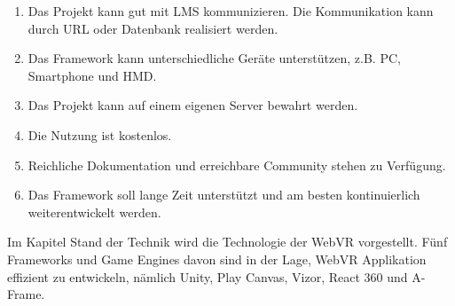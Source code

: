  \begin{enumerate}
     \item Das Projekt kann gut mit LMS kommunizieren. Die Kommunikation kann durch URL oder Datenbank realisiert werden.
     \item Das Framework kann unterschiedliche Geräte unterstützen, z.B. PC, Smartphone und HMD.
     \item Das Projekt kann auf einem eigenen Server bewahrt werden.
     \item Die Nutzung ist kostenlos.
     \item Reichliche Dokumentation und erreichbare Community stehen zu Verfügung.
     \item Das Framework soll lange Zeit unterstützt und am besten kontinuierlich weiterentwickelt werden.
 \end{enumerate}
 
 Im Kapitel Stand der Technik wird die Technologie der WebVR vorgestellt. Fünf Frameworks und Game Engines davon sind in der Lage, WebVR Applikation effizient zu entwickeln, nämlich Unity, Play Canvas, Vizor, React 360 und A-Frame.
 
